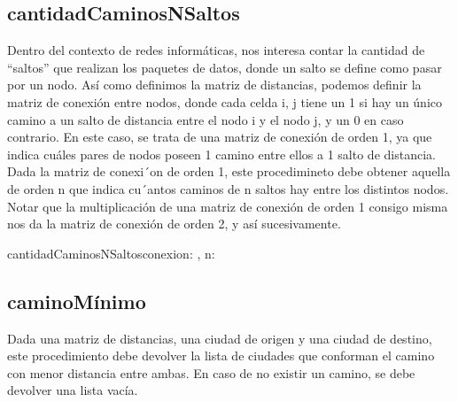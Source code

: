 \documentclass[10pt,a4paper]{article}
\begin{document}
\subsection {cantidadCaminosNSaltos}
Dentro del contexto de redes informáticas, nos interesa contar la cantidad de “saltos”
que realizan los paquetes de datos, donde un salto se define como pasar por un nodo.
Así como definimos la matriz de distancias, podemos definir la matriz de conexión entre nodos, donde cada celda i, j
tiene un 1 si hay un único camino a un salto de distancia entre el nodo i y el nodo j, y un 0 en caso contrario. En este
caso, se trata de una matriz de conexión de orden 1, ya que indica cuáles pares de nodos poseen 1 camino entre ellos a
1 salto de distancia.
Dada la matriz de conexi´on de orden 1, este procedimineto debe obtener aquella de orden n que indica cu´antos caminos
de n saltos hay entre los distintos nodos. Notar que la multiplicación de una matriz de conexión de orden 1 consigo
misma nos da la matriz de conexión de orden 2, y así sucesivamente.
\vspace{0.3cm}
\begin{proc}{cantidadCaminosNSaltos}{\Inout conexion: \TLista{\TLista{\ent}}, \In n:\ent }{}


	\vspace{0.2cm}
	
\end{proc}


\subsection {caminoMínimo}
Dada una matriz de distancias, una ciudad de origen y una ciudad de destino, este procedimiento
debe devolver la lista de ciudades que conforman el camino con menor distancia entre ambas. En caso de no existir un
camino, se debe devolver una lista vacía.
\end{document}
